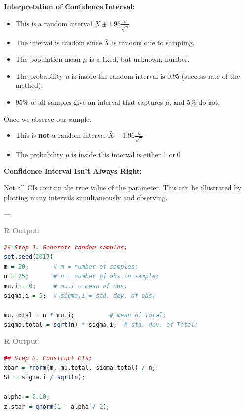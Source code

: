 \vspace{1.5em}
\textbf{Interpretation of Confidence Interval:}

\begin{itemize}
  \item This is a random interval $\bar{X} \pm 1.96 \frac{\sigma}{\sqrt{n}}$
  \item The interval is random since $\bar{X}$ is random due to sampling.
  \item The population mean $\mu$ is a fixed, but unknown, number.
  \item The probability $\mu$ is inside the random interval is 0.95 (success rate of the method).
  \item 95\% of all samples give an interval that captures $\mu$, and 5\% do not.
\end{itemize}

\vspace{1em}
Once we observe our sample:

\begin{itemize}
  \item This is \textbf{not} a random interval $\bar{X} \pm 1.96 \frac{\sigma}{\sqrt{n}}$
  \item The probability $\mu$ is inside this interval is either 1 or 0
\end{itemize}

\vspace{1em}
\textbf{Confidence Interval Isn’t Always Right:}

Not all CIs contain the true value of the parameter. This can be illustrated by plotting many intervals simultaneously and observing.

---

\vspace{2em}
\textcolor{gray}{\textbf{R Output:}}

\begin{lstlisting}[language=R]
## Step 1. Generate random samples;
set.seed(2017)
m = 50;       # m = number of samples;
n = 25;       # n = number of obs in sample;
mu.i = 0;     # mu.i = mean of obs;
sigma.i = 5;  # sigma.i = std. dev. of obs;

mu.total = n * mu.i;          # mean of Total;
sigma.total = sqrt(n) * sigma.i;  # std. dev. of Total;
\end{lstlisting}

\vspace{1em}
\textcolor{gray}{\textbf{R Output:}}

\begin{lstlisting}[language=R]
## Step 2. Construct CIs;
xbar = rnorm(m, mu.total, sigma.total) / n;
SE = sigma.i / sqrt(n);

alpha = 0.10;
z.star = qnorm(1 - alpha / 2);
\end{lstlisting}

